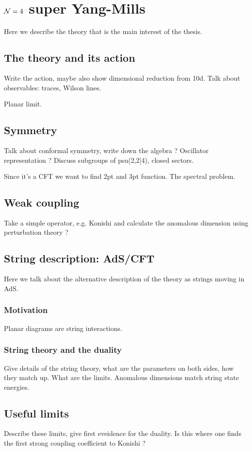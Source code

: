 
\section{$\mathcal{N}=4$ super Yang-Mills}

Here we describe the theory that is the main interest of the thesis.

\subsection{The theory and its action}

Write the action, maybe also show dimensional reduction from 10d. Talk about observables: traces, Wilson lines. 

Planar limit.

\subsection{Symmetry}

Talk about conformal symmetry, write down the algebra ? Oscillator representation ? Discuss subgroups of psu(2,2|4), closed sectors. 

Since it's a CFT we want to find 2pt and 3pt function. The spectral problem.

\subsection{Weak coupling}

Take a simple operator, e.g. Konishi and calculate the anomalous dimension using perturbation theory ?

\subsection{String description: AdS/CFT}

Here we talk about the alternative description of the theory as strings moving in AdS.

\subsubsection{Motivation}

Planar diagrams are string interactions.

\subsubsection{String theory and the duality}

Give details of the string theory, what are the parameters on both sides, how they match up. What are the limits. Anomalous dimensions match string state energies.

\subsection{Useful limits}

Describe these limits, give first eveidence for the duality. Is this where one finds the first strong coupling coefficient to Konishi ?